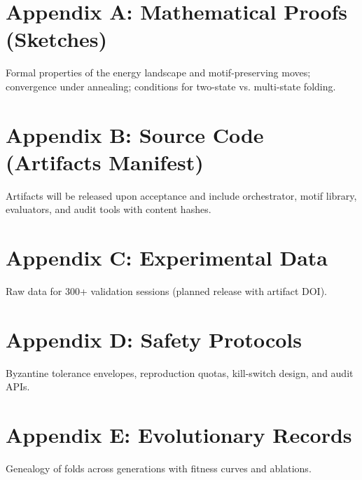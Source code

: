 \documentclass[11pt]{article}
\begin{document}
\section*{Appendix A: Mathematical Proofs (Sketches)}
Formal properties of the energy landscape and motif-preserving moves; convergence under annealing; conditions for two-state vs. multi-state folding.
\section*{Appendix B: Source Code (Artifacts Manifest)}
Artifacts will be released upon acceptance and include orchestrator, motif library, evaluators, and audit tools with content hashes.
\section*{Appendix C: Experimental Data}
Raw data for 300+ validation sessions (planned release with artifact DOI).
\section*{Appendix D: Safety Protocols}
Byzantine tolerance envelopes, reproduction quotas, kill-switch design, and audit APIs.
\section*{Appendix E: Evolutionary Records}
Genealogy of folds across generations with fitness curves and ablations.
\end{document}
